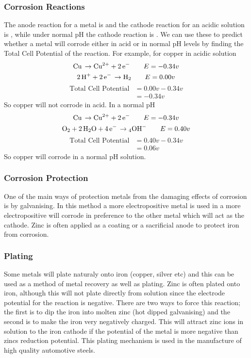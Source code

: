 \documentclass[a4paper, 12pt]{article}
\begin{document}
		\subsubsection*{Corrosion Reactions}
			The anode reaction for a metal is  and the cathode reaction for an acidic solution is , while under normal pH the cathode reaction is . We can use these to predict whether a metal will corrode either in acid or in normal pH levels by finding the Total Cell Potential of the reaction. For example, for copper in acidic solution
			\[ \ce{Cu \rightarrow Cu^2+ + 2e-} \qquad E=-0.34v \]
			\[ \ce{2H+ +2e- \rightarrow H2} \qquad E=0.00v \]
			\begin{align*}
				\text{Total Cell Potential} &= 0.00v -0.34v \\
									&= -0.34v
			\end{align*} 
			So copper will not corrode in acid. In a normal pH
			\[ \ce{Cu \rightarrow Cu^2+ + 2e-} \qquad E=-0.34v \]
			\[ \ce{O2 + 2H2O + 4e- \rightarrow 4OH-} \qquad E=0.40v \]
			\begin{align*}
				\text{Total Cell Potential} &= 0.40v -0.34v \\
									&= 0.06v
			\end{align*} 
			So copper will corrode in a normal pH solution. 
			
		\subsubsection*{Corrosion Protection}
			One of the main ways of protection metals from the damaging effects of corrosion is by galvanising. In this method a more electropositive metal is used in a more electropositive will corrode in preference to the other metal which will act as the cathode. Zinc is often applied as a coating or a sacrificial anode to protect iron from corrosion. 
			
		\subsubsection*{Plating}
			Some metals will plate naturaly onto iron (copper, silver etc) and this can be used as a method of metal recovery as well as plating. Zinc is often plated onto iron, although this will not plate directly from solution since the electrode potential for the reaction is negative. There are two ways to force this reaction; the first is to dip the iron into molten zinc (hot dipped galvanising) and the second is to make the iron very negatively charged. This will attract zinc ions in solution to the iron cathode if the potential of the metal is more negative than zincs reduction potential. This plating mechanism is used in the manufacture of high quality automotive steels. 
			
\end{document}
